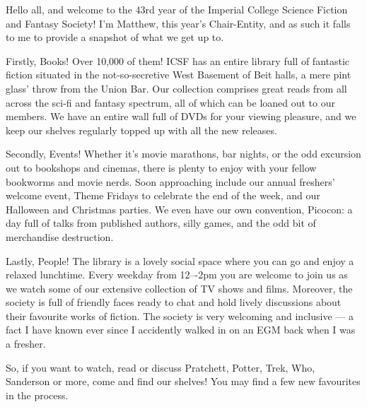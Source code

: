 Hello all, and welcome to the 43rd year of the Imperial College
Science Fiction and Fantasy Society!  I’m Matthew, this year’s
Chair-Entity, and as such it falls to me to provide a snapshot of what
we get up to.

Firstly, Books! Over 10,000 of them! ICSF has an entire library full
of fantastic fiction situated in the not-so-secretive West Basement of
Beit halls, a mere pint glass’ throw\footnotemark[2]{} from the Union
Bar. Our collection comprises great reads from all across the sci-fi
and fantasy spectrum, all of which can be loaned out to our
members. We have an entire wall full of DVDs for your viewing
pleasure, and we keep our shelves regularly topped up with all the new
releases.

Secondly, Events! Whether it’s movie marathons, bar nights, or the odd
excursion out to bookshops and cinemas, there is plenty to enjoy with
your fellow bookworms and movie nerds. Soon approaching include our
annual freshers’ welcome event, Theme Fridays to celebrate the end of
the week, and our Halloween and Christmas parties. We even have our
own convention, Picocon: a day full of talks from published authors,
silly games, and the odd bit of merchandise destruction.

Lastly, People! The library is a lovely social space where you can go
and enjoy a relaxed lunchtime.  Every weekday from 12–-2pm you are
welcome to join us as we watch some of our extensive collection of TV
shows and films. Moreover, the society is full of friendly faces ready
to chat and hold lively discussions about their favourite works of
fiction. The society is very welcoming and inclusive --- a fact I have
known ever since I accidently walked in on an EGM back when I was a
fresher.

So, if you want to watch, read or discuss Pratchett, Potter, Trek,
Who, Sanderson or more, come and find our shelves! You may find a few
new favourites in the process.
